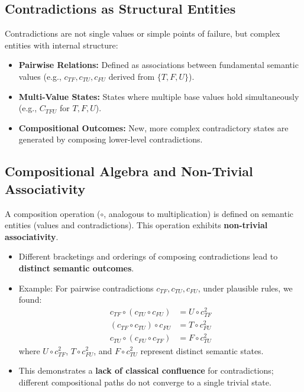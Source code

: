 	\subsection{Contradictions as Structural Entities}
	Contradictions are not single values or simple points of failure, but complex entities with internal structure:
	\begin{itemize}
		\item \textbf{Pairwise Relations:} Defined as associations between fundamental semantic values (e.g., $c_{TF}, c_{TU}, c_{FU}$ derived from $\{T, F, U\}$).
		\item \textbf{Multi-Value States:} States where multiple base values hold simultaneously (e.g., $C_{TFU}$ for $T, F, U$).
		\item \textbf{Compositional Outcomes:} New, more complex contradictory states are generated by composing lower-level contradictions.
	\end{itemize}
	
	\subsection{Compositional Algebra and Non-Trivial Associativity}
	A composition operation ($\circ$, analogous to multiplication) is defined on semantic entities (values and contradictions). This operation exhibits \textbf{non-trivial associativity}.
	\begin{itemize}
		\item Different bracketings and orderings of composing contradictions lead to \textbf{distinct semantic outcomes}.
		\item Example: For pairwise contradictions $c_{TF}, c_{TU}, c_{FU}$, under plausible rules, we found:
		\begin{align*} c_{TF} \circ (c_{TU} \circ c_{FU}) &= U \circ c_{TF}^2 \\ (c_{TF} \circ c_{TU}) \circ c_{FU} &= T \circ c_{FU}^2 \\ c_{TU} \circ (c_{FU} \circ c_{TF}) &= F \circ c_{TU}^2 \end{align*}
		where $U \circ c_{TF}^2$, $T \circ c_{FU}^2$, and $F \circ c_{TU}^2$ represent distinct semantic states.
		\item This demonstrates a \textbf{lack of classical confluence} for contradictions; different compositional paths do not converge to a single trivial state.
	\end{itemize}
	
